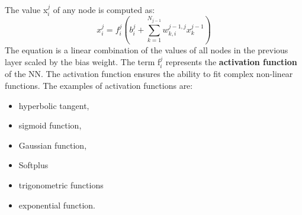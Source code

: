 \documentclass[12pt]{article}
\begin{document}
The value x$_i^j$ of any node is computed as:
\begin{equation}
    x_i^{j} = f_i^j(b_i^j + \sum_{k=1}^{N_{j-1}} w_{k,i}^{j-1,j} x_k^{j-1})
\end{equation}
The equation is a linear combination of the values of all nodes in the previous layer scaled by the bias weight. The term f$_i^j$ represents the \textbf{activation function} of the NN. The activation function ensures the ability to fit complex non-linear functions. The examples of activation functions are:
\begin{itemize}
    \item hyperbolic tangent,
    \item sigmoid function,
    \item Gaussian function,
    \item Softplus
    \item trigonometric functions
    \item exponential function.
\end{itemize}
\end{document}
